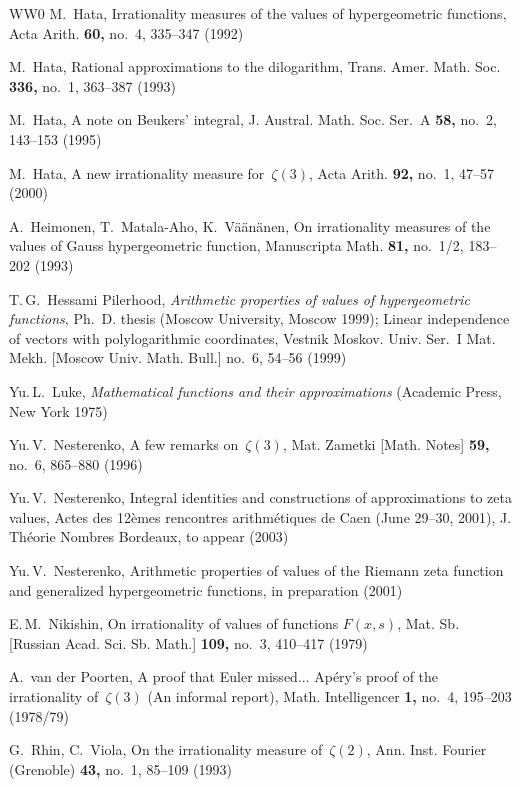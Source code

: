 \documentclass[a4paper,twoside]{article}
\numberwithin{equation}{section}
\renewcommand{\[}{\lfloor}
\renewcommand{\]}{\rfloor}
\newcommand{\<}{\langle}
\renewcommand{\>}{\rangle}
\begin{document}
\begin{thebibliography}{WW0}
M.~Hata,
Irrationality measures of the values of hypergeometric functions,
Acta Arith. \textbf{60,} no.~4, 335--347 (1992)

M.~Hata,
Rational approximations to the dilogarithm,
Trans. Amer. Math. Soc. \textbf{336,} no.~1, 363--387 (1993)

M.~Hata,
A note on Beukers' integral,
J. Austral. Math. Soc. Ser.~A \textbf{58,} no.~2, 143--153 (1995)

M.~Hata,
A new irrationality measure for~$\zeta(3)$,
Acta Arith. \textbf{92,} no.~1, 47--57 (2000)

A.~Heimonen, T.~Matala-Aho, K.~V\"a\"an\"anen,
On irrationality measures of the values
of Gauss hypergeometric function,
Manuscripta Math. \textbf{81,} no.~1/2, 183--202 (1993)

T.\,G.~Hessami Pilerhood,
\textit{Arithmetic properties of values of hypergeometric functions},
Ph.~D. thesis (Moscow University, Moscow 1999);
Linear independence of vectors with polylogarithmic coordinates,
Vestnik Moskov. Univ. Ser.~I Mat. Mekh. [Moscow Univ. Math. Bull.]
no.~6, 54--56 (1999)

Yu.\,L.~Luke,
\textit{Mathematical functions and their approximations\/}
(Academic Press, New York 1975)

Yu.\,V.~Nesterenko,
A few remarks on~$\zeta(3)$,
Mat. Zametki [Math. Notes] \textbf{59,} no.~6, 865--880 (1996)

Yu.\,V.~Nesterenko,
Integral identities and constructions of approximations
to zeta values,
Actes des 12\`emes rencontres arithm\'etiques de Caen
(June 29--30, 2001),
J. Th\'eorie Nombres Bordeaux,
to appear (2003)

Yu.\,V.~Nesterenko,
Arithmetic properties of values of the Riemann zeta function
and generalized hypergeometric functions,
in preparation (2001)

E.\,M.~Nikishin,
On irrationality of values of functions $F(x,s)$,
Mat. Sb. [Russian Acad. Sci. Sb. Math.] \textbf{109,} no.~3, 410--417 (1979)

A.~van der Poorten,
A proof that Euler missed...
Ap\'ery's proof of the irrationality of~$\zeta(3)$
(An informal report),
Math. Intelligencer \textbf{1,} no.~4, 195--203 (1978/79)

G.~Rhin, C.~Viola,
On the irrationality measure of~$\zeta(2)$,
Ann. Inst. Fourier (Grenoble) \textbf{43,} no.~1, 85--109 (1993)


\end{thebibliography}
\end{document}
